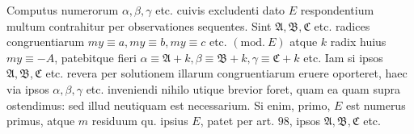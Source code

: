 Computus numerorum \(\alpha,\allowbreak \beta,\allowbreak \gamma\) etc. cuivis excludenti dato \(E\) respondentium multum contrahitur per observationes sequentes. Sint \(\mathfrak A,\allowbreak \mathfrak B,\allowbreak \mathfrak C\) etc. radices congruentiarum \(my\equiv a,\allowbreak my\equiv b,\allowbreak my\equiv c\) etc. \((\mathrm{mod.}\ E)\) atque \(k\) radix huius \(my\equiv-A\), patebitque fieri \(\alpha\equiv\mathfrak A+k,\allowbreak \beta\equiv\mathfrak B+k,\allowbreak \gamma\equiv\mathfrak C+k\) etc. Iam si ipsos \(\mathfrak A,\allowbreak \mathfrak B,\allowbreak \mathfrak C\) etc. revera per solutionem illarum congruentiarum eruere oporteret, haec via ipsos \(\alpha,\allowbreak \beta,\allowbreak \gamma\) etc. inveniendi nihilo utique brevior foret, quam ea quam supra ostendimus: sed illud neutiquam est necessarium. Si enim, primo, \(E\) est numerus primus, atque \(m\) residuum qu. ipsius \(E\), patet per art. \(98\), ipsos \(\mathfrak A,\allowbreak \mathfrak B,\allowbreak \mathfrak C\) etc.
